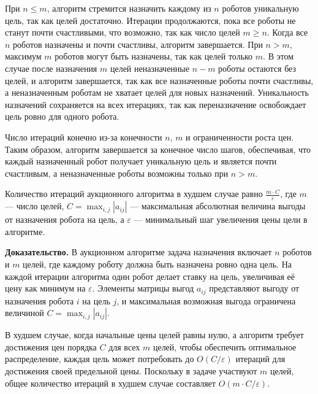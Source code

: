 При \( n \leq m \), алгоритм стремится назначить каждому из \( n \) роботов уникальную цель, так как целей достаточно. Итерации продолжаются, пока все роботы не станут почти счастливыми, что возможно, так как число целей \( m \geq n \). Когда все \( n \) роботов назначены и почти счастливы, алгоритм завершается. При \( n > m \), максимум \( m \) роботов могут быть назначены, так как целей только \( m \). В этом случае после назначения \( m \) целей неназначенные \( n - m \) роботы остаются без целей, и алгоритм завершается, так как все назначенные роботы почти счастливы, а неназначенным роботам не хватает целей для новых назначений. Уникальность назначений сохраняется на всех итерациях, так как переназначение освобождает цель ровно для одного робота.

Число итераций конечно из-за конечности \( n \), \( m \) и ограниченности роста цен. Таким образом, алгоритм завершается за конечное число шагов, обеспечивая, что каждый назначенный робот получает уникальную цель и является почти счастливым, а неназначенные роботы возможны только при \( n > m \).

\begin{theorem}
\label{thm:auction_iterations}
Количество итераций аукционного алгоритма в худшем случае равно \( \frac{m \cdot C}{\varepsilon} \), где \( m \) — число целей, \( C = \max_{i,j} |a_{ij}| \) — максимальная абсолютная величина выгоды от назначения робота на цель, а \( \varepsilon \) — минимальный шаг увеличения цены цели в алгоритме.
\end{theorem}

\textbf{Доказательство.}  
В аукционном алгоритме задача назначения включает \( n \) роботов и \( m \) целей, где каждому роботу должна быть назначена ровно одна цель. На каждой итерации алгоритма один робот делает ставку на цель, увеличивая её цену как минимум на \( \varepsilon \). Элементы матрицы выгод \( a_{ij} \) представляют выгоду от назначения робота \( i \) на цель \( j \), и максимальная возможная выгода ограничена величиной \( C = \max_{i,j} |a_{ij}| \). 

В худшем случае, когда начальные цены целей равны нулю, а алгоритм требует достижения цен порядка \( C \) для всех \( m \) целей, чтобы обеспечить оптимальное распределение, каждая цель может потребовать до \( O(C / \varepsilon) \) итераций для достижения своей предельной цены. Поскольку в задаче участвуют \( m \) целей, общее количество итераций в худшем случае составляет \( O(m \cdot C / \varepsilon) \).

